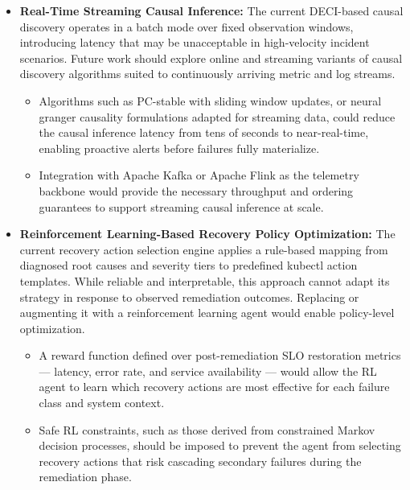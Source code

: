 \begin{itemize}
    \item \textbf{Real-Time Streaming Causal Inference:}
    The current DECI-based causal discovery operates in a batch mode over fixed observation windows, introducing latency that may be unacceptable in high-velocity incident scenarios. Future work should explore online and streaming variants of causal discovery algorithms suited to continuously arriving metric and log streams.
    \begin{itemize}
        \item Algorithms such as PC-stable with sliding window updates, or neural granger causality formulations adapted for streaming data, could reduce the causal inference latency from tens of seconds to near-real-time, enabling proactive alerts before failures fully materialize.
        \item Integration with Apache Kafka or Apache Flink as the telemetry backbone would provide the necessary throughput and ordering guarantees to support streaming causal inference at scale.
    \end{itemize}

    \item \textbf{Reinforcement Learning-Based Recovery Policy Optimization:}
    The current recovery action selection engine applies a rule-based mapping from diagnosed root causes and severity tiers to predefined kubectl action templates. While reliable and interpretable, this approach cannot adapt its strategy in response to observed remediation outcomes. Replacing or augmenting it with a reinforcement learning agent would enable policy-level optimization.
    \begin{itemize}
        \item A reward function defined over post-remediation SLO restoration metrics — latency, error rate, and service availability — would allow the RL agent to learn which recovery actions are most effective for each failure class and system context.
        \item Safe RL constraints, such as those derived from constrained Markov decision processes, should be imposed to prevent the agent from selecting recovery actions that risk cascading secondary failures during the remediation phase.
    \end{itemize}


\end{itemize}
